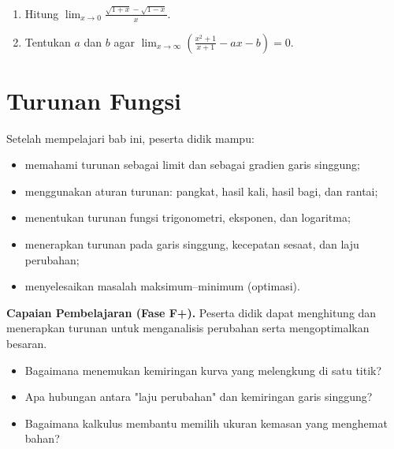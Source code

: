 \documentclass[11pt,a4paper]{report}
\theoremstyle{gaya}
\begin{document}
\begin{challenge}
\begin{enumerate}[leftmargin=*,topsep=2pt]
  \item Hitung $\displaystyle\lim_{x\to0}\frac{\sqrt{1+x}-\sqrt{1-x}}{x}$.
  \item Tentukan $a$ dan $b$ agar $\displaystyle\lim_{x\to\infty}\left(\frac{x^2+1}{x+1}-ax-b\right)=0$.
\end{enumerate}
\end{challenge}

\chapter{Turunan Fungsi}
\begin{tujuan}
Setelah mempelajari bab ini, peserta didik mampu:
\begin{itemize}[leftmargin=*,topsep=2pt]
  \item memahami turunan sebagai limit dan sebagai gradien garis singgung;
  \item menggunakan aturan turunan: pangkat, hasil kali, hasil bagi, dan rantai;
  \item menentukan turunan fungsi trigonometri, eksponen, dan logaritma;
  \item menerapkan turunan pada garis singgung, kecepatan sesaat, dan laju perubahan;
  \item menyelesaikan masalah maksimum--minimum (optimasi).
\end{itemize}
\textbf{Capaian Pembelajaran (Fase F+).} Peserta didik dapat menghitung dan menerapkan turunan untuk menganalisis perubahan serta mengoptimalkan besaran.
\end{tujuan}

\begin{pemantik}
\begin{itemize}[leftmargin=*,topsep=2pt]
  \item Bagaimana menemukan kemiringan kurva yang melengkung di satu titik?
  \item Apa hubungan antara "laju perubahan" dan kemiringan garis singgung?
  \item Bagaimana kalkulus membantu memilih ukuran kemasan yang menghemat bahan?
\end{itemize}
\end{pemantik}
\end{document}
